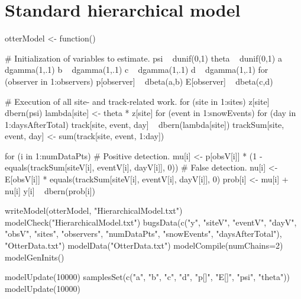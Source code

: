 \documentclass[12pt]{article}
\begin{document}
\section{Standard hierarchical model}
\scriptsize
\begin{verbatimtab}
otterModel <- function() {
    # Initialization of variables to estimate.
    psi ~ dunif(0,1)
    theta ~ dunif(0,1)
    a ~ dgamma(1,.1)
    b ~ dgamma(1,.1)
    c ~ dgamma(1,.1)
    d ~ dgamma(1,.1)
    for (observer in 1:observers) {
        p[observer] ~ dbeta(a,b) %
        E[observer] ~ dbeta(c,d) %
    }

    # Execution of all site- and track-related work.
    for (site in 1:sites) {
        z[site] ~ dbern(psi)
        lambda[site] <- theta * z[site]
        for (event in 1:snowEvents) {
            for (day in 1:daysAfterTotal) {
                track[site, event, day] ~ dbern(lambda[site])
                trackSum[site, event, day] <- sum(track[site, event, 1:day])
            }
        }
    }

    for (i in 1:numDataPts) {
        # Positive detection.
        mu[i] <-
            p[obsV[i]] * (1 - equals(trackSum[siteV[i], eventV[i], dayV[i]], 0))
        # False detection.
        nu[i] <- E[obsV[i]] * equals(trackSum[siteV[i], eventV[i], dayV[i]], 0)
        prob[i] <- mu[i] + nu[i]
        y[i] ~ dbern(prob[i])
    }
}

writeModel(otterModel, "HierarchicalModel.txt")
modelCheck("HierarchicalModel.txt")
bugsData(c("y", "siteV", "eventV", "dayV", "obsV", "sites", "observers",
           "numDataPts", "snowEvents", "daysAfterTotal"),
         "OtterData.txt")
modelData("OtterData.txt")
modelCompile(numChains=2)
modelGenInits()

modelUpdate(10000)
samplesSet(c("a", "b", "c", "d", "p[]", "E[]", "psi", "theta"))
modelUpdate(10000)
\end{verbatimtab}
\end{document}
